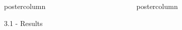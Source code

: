\documentclass{beamer}
\newlength{\columnheight}
\begin{document}
\begin{frame}
\begin{columns}
\begin{column}{.499\textwidth}
\begin{beamercolorbox}[center]{postercolumn}
\begin{minipage}{.98\textwidth}
{\begin{myblock}{3.1 - Results}




\end{myblock}\vfill					

		}\end{minipage}\end{beamercolorbox}
	\end{column}
	
	\begin{column}{.249\textwidth}
		\begin{beamercolorbox}[center]{postercolumn}
			\begin{minipage}{.98\textwidth}  %
				\parbox[t][\columnheight]{\textwidth}{ %

}
\end{minipage}
\end{beamercolorbox}
\end{column}
\end{columns}
\end{frame}
\end{document}
